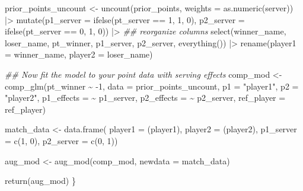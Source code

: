 \documentclass[
  letterpaper,
  DIV=11,
  numbers=noendperiod]{scrartcl}
\newenvironment{Shaded}{\begin{snugshade}}{\end{snugshade}}
\newcommand{\AttributeTok}[1]{\textcolor[rgb]{0.40,0.45,0.13}{#1}}
\newcommand{\DecValTok}[1]{\textcolor[rgb]{0.68,0.00,0.00}{#1}}
\newcommand{\DocumentationTok}[1]{\textcolor[rgb]{0.37,0.37,0.37}{\textit{#1}}}
\newcommand{\FunctionTok}[1]{\textcolor[rgb]{0.28,0.35,0.67}{#1}}
\newcommand{\NormalTok}[1]{\textcolor[rgb]{0.00,0.23,0.31}{#1}}
\newcommand{\OtherTok}[1]{\textcolor[rgb]{0.00,0.23,0.31}{#1}}
\newcommand{\SpecialCharTok}[1]{\textcolor[rgb]{0.37,0.37,0.37}{#1}}
\newcommand{\StringTok}[1]{\textcolor[rgb]{0.13,0.47,0.30}{#1}}
\begin{document}
\begin{Shaded}
\begin{Highlighting}[]
\NormalTok{  prior\_points\_uncount }\OtherTok{\textless{}{-}} \FunctionTok{uncount}\NormalTok{(prior\_points, }\AttributeTok{weights =} \FunctionTok{as.numeric}\NormalTok{(server)) }\SpecialCharTok{|\textgreater{}}
    \FunctionTok{mutate}\NormalTok{(}\AttributeTok{p1\_server =} \FunctionTok{ifelse}\NormalTok{(pt\_server }\SpecialCharTok{==} \DecValTok{1}\NormalTok{, }\DecValTok{1}\NormalTok{, }\DecValTok{0}\NormalTok{),}
           \AttributeTok{p2\_server =} \FunctionTok{ifelse}\NormalTok{(pt\_server }\SpecialCharTok{==} \DecValTok{0}\NormalTok{, }\DecValTok{1}\NormalTok{, }\DecValTok{0}\NormalTok{)) }\SpecialCharTok{|\textgreater{}}
    \DocumentationTok{\#\# reorganize columns}
    \FunctionTok{select}\NormalTok{(winner\_name, loser\_name, pt\_winner, p1\_server, p2\_server, }\FunctionTok{everything}\NormalTok{()) }\SpecialCharTok{|\textgreater{}}
    \FunctionTok{rename}\NormalTok{(}\AttributeTok{player1 =}\NormalTok{ winner\_name, }\AttributeTok{player2 =}\NormalTok{ loser\_name)}
  
  \DocumentationTok{\#\# Now fit the model to your point data with serving effects}
\NormalTok{  comp\_mod }\OtherTok{\textless{}{-}} \FunctionTok{comp\_glm}\NormalTok{(pt\_winner }\SpecialCharTok{\textasciitilde{}} \SpecialCharTok{{-}}\DecValTok{1}\NormalTok{, }\AttributeTok{data =}\NormalTok{ prior\_points\_uncount,}
                       \AttributeTok{p1 =} \StringTok{"player1"}\NormalTok{, }\AttributeTok{p2 =} \StringTok{"player2"}\NormalTok{,}
                       \AttributeTok{p1\_effects =} \SpecialCharTok{\textasciitilde{}}\NormalTok{ p1\_server, }\AttributeTok{p2\_effects =} \SpecialCharTok{\textasciitilde{}}\NormalTok{ p2\_server,}
                       \AttributeTok{ref\_player =}\NormalTok{ ref\_player)}
  
\NormalTok{  match\_data }\OtherTok{\textless{}{-}} \FunctionTok{data.frame}\NormalTok{(}
    \AttributeTok{player1 =}\NormalTok{ (player1),}
    \AttributeTok{player2 =}\NormalTok{ (player2),}
    \AttributeTok{p1\_server =} \FunctionTok{c}\NormalTok{(}\DecValTok{1}\NormalTok{, }\DecValTok{0}\NormalTok{),}
    \AttributeTok{p2\_server =} \FunctionTok{c}\NormalTok{(}\DecValTok{0}\NormalTok{, }\DecValTok{1}\NormalTok{))}
  
\NormalTok{  aug\_mod }\OtherTok{\textless{}{-}} \FunctionTok{aug\_mod}\NormalTok{(comp\_mod, }\AttributeTok{newdata =}\NormalTok{ match\_data)}
  
  \FunctionTok{return}\NormalTok{(aug\_mod)}
\NormalTok{\}}
\end{Highlighting}
\end{Shaded}
\end{document}
